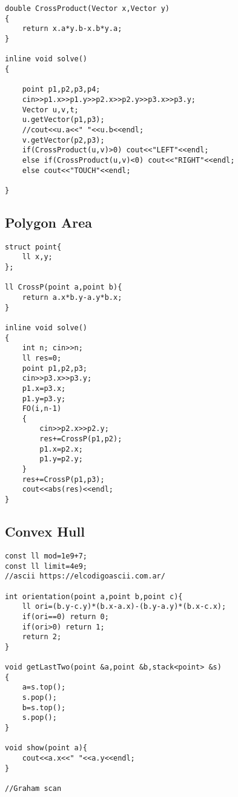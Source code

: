 \documentclass[10pt]{article}
\begin{document}
\begin{multicols*}{2}
\begin{lstlisting}[style=compactcpp]
double CrossProduct(Vector x,Vector y)
{
    return x.a*y.b-x.b*y.a;
}

inline void solve()
{
    
    point p1,p2,p3,p4;
    cin>>p1.x>>p1.y>>p2.x>>p2.y>>p3.x>>p3.y;
    Vector u,v,t;
    u.getVector(p1,p3);
    //cout<<u.a<<" "<<u.b<<endl;
    v.getVector(p2,p3);
    if(CrossProduct(u,v)>0) cout<<"LEFT"<<endl;
    else if(CrossProduct(u,v)<0) cout<<"RIGHT"<<endl;
    else cout<<"TOUCH"<<endl;
    
}

\end{lstlisting}
\subsection{Polygon Area}
\begin{lstlisting}[style=compactcpp]
struct point{
    ll x,y;
};

ll CrossP(point a,point b){
    return a.x*b.y-a.y*b.x;
}

inline void solve()
{
    int n; cin>>n;
    ll res=0;
    point p1,p2,p3;
    cin>>p3.x>>p3.y;
    p1.x=p3.x;
    p1.y=p3.y;
    FO(i,n-1)
    {
        cin>>p2.x>>p2.y;
        res+=CrossP(p1,p2);
        p1.x=p2.x;
        p1.y=p2.y;
    }
    res+=CrossP(p1,p3);
    cout<<abs(res)<<endl;
}
\end{lstlisting}
\subsection{Convex Hull}
\begin{lstlisting}[style=compactcpp]
const ll mod=1e9+7;
const ll limit=4e9;
//ascii https://elcodigoascii.com.ar/

int orientation(point a,point b,point c){
    ll ori=(b.y-c.y)*(b.x-a.x)-(b.y-a.y)*(b.x-c.x);
    if(ori==0) return 0;
    if(ori>0) return 1;
    return 2;
}

void getLastTwo(point &a,point &b,stack<point> &s)
{
    a=s.top();
    s.pop();
    b=s.top();
    s.pop();
}

void show(point a){
    cout<<a.x<<" "<<a.y<<endl;
}

//Graham scan
 

\end{lstlisting}
\end{multicols*}
\end{document}
